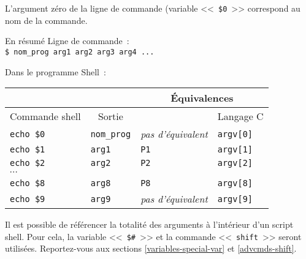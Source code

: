 L'argument z{\'e}ro de la ligne de commande (variable <<~\verb=$0=~>> correspond au nom de la commande.

\begin{definition}{En r{\'e}sum{\'e}}
Ligne de commande~:\\
\verb=$ nom_prog arg1 arg2 arg3 arg4 ...=

Dans le programme Shell~:\\

\begin{tabular}{|l|l|l|l|}
		\hline
		\multicolumn{2}{|l|}{}					&
		\multicolumn{2}{|c|}{\'{E}quivalences}	\\
	\hline
		\multicolumn{1}{|c|}{Commande shell}	&
		\multicolumn{1}{|c|}{Sortie}			&
		\multicolumn{1}{|c|}{{\OpenVMS}}		&
		\multicolumn{1}{|c|}{Langage C}			\\
	\hline \hline
		{\tt echo \$0}					&
		{\tt nom\_prog}					&
		{\sl pas d'{\'e}quivalent}			&
		{\tt argv[0]}					\\
	\hline
		{\tt echo \$1}					&
		{\tt arg1}						&
		{\tt P1}						&
		{\tt argv[1]}					\\
	\hline
		{\tt echo \$2}					&
		{\tt arg2}						&
		{\tt P2}						&
		{\tt argv[2]}					\\
	\hline
		\multicolumn{4}{|l|}{$\cdots$}	\\
	\hline
		{\tt echo \$8}					&
		{\tt arg8}						&
		{\tt P8}						&
		{\tt argv[8]}					\\
	\hline
		{\tt echo \$9}					&
		{\tt arg9}						&
		{\sl pas d'{\'e}quivalent}			&
		{\tt argv[9]}					\\
	\hline
\end{tabular}
\end{definition}

Il est possible de r{\'e}f{\'e}rencer la totalit{\'e} des arguments
{\`a} l'int{\'e}rieur d'un script shell. Pour cela, la variable
<<~\verb=$#=~>> et la commande
<<~{\tt shift}~>> seront utilis{\'e}es.
Reportez-vous aux sections \ref{variables-special-var} et
\ref{advcmds-shift}.
